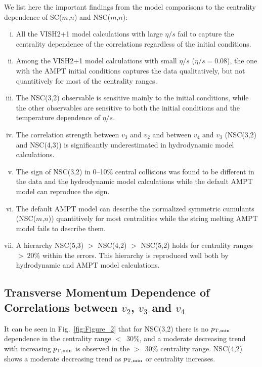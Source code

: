 We list here the important findings from the model comparisons to the centrality dependence of SC($m$,$n$) and NSC($m$,$n$):
\begin{enumerate}[(i)]
	\item All the VISH2+1 model calculations with large $\eta/s$ fail to capture the centrality dependence of the correlations regardless of the initial conditions.
	\item Among the VISH2+1 model calculations with small $\eta/s$ ($\eta/s=0.08$), the one with the AMPT initial conditions captures the data qualitatively, but not quantitively for most of the centrality ranges.
	\item The NSC(3,2) observable is sensitive mainly to the initial conditions, while the other observables are sensitive to both the initial conditions and the temperature dependence of $\eta/s$.
	\item The correlation strength between $v_3$ and $v_2$ and between $v_4$ and $v_3$ (NSC(3,2) and NSC(4,3)) is significantly underestimated in hydrodynamic model calculations.
	\item The sign of NSC(3,2) in 0--10\% central collisions was found to be different in the data and the hydrodynamic model calculations while the default AMPT model can reproduce the sign.
	\item The default AMPT model can describe the normalized symmetric cumulants (NSC($m$,$n$)) quantitively for most centralities while the string melting AMPT model fails to describe them.
	\item A hierarchy NSC(5,3) $>$ NSC(4,2) $>$ NSC(5,2) holds for centrality ranges $>~20\%$ within the errors. This hierarchy is reproduced well both by hydrodynamic and AMPT model calculations.

\end{enumerate}


\subsection{Transverse Momentum Dependence of Correlations between $v_2$, $v_3$ and $v_4$}
\label{sec:ptdepsc}

It can be seen in Fig.~\ref{fig:Figure_2} that for NSC(3,2) there is no $p_{\rm T, min}$ dependence in the centrality range $<$~30\%, and a moderate decreasing trend with increasing $p_{\rm T, min}$ is observed in the $>$~30\% centrality range.
NSC(4,2) shows a moderate decreasing trend as $p_{\rm T, min}$ or centrality increases. 

